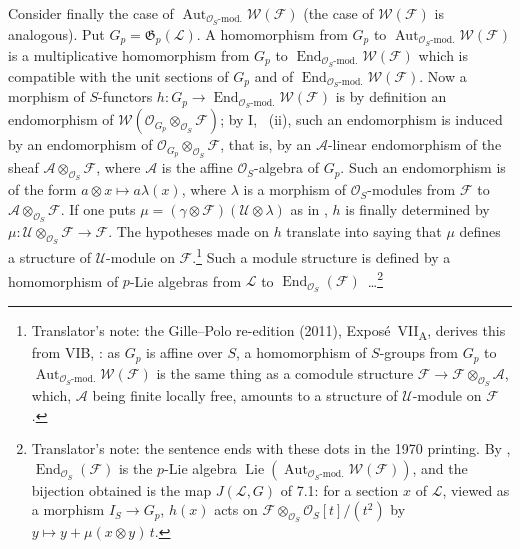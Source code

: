 Consider finally the case of
\(\operatorname{Aut}_{\mathcal O_S\text{-mod.}}\mathcal W(\mathcal F)\)
(the case of \(\mathcal W(\mathcal F)\) is analogous). Put
\(G_p=\mathfrak G_p(\mathcal L)\). A homomorphism from \(G_p\) to
\(\operatorname{Aut}_{\mathcal O_S\text{-mod.}}\mathcal W(\mathcal F)\) is
a multiplicative homomorphism from \(G_p\) to
\(\operatorname{End}_{\mathcal O_S\text{-mod.}}\mathcal W(\mathcal F)\)
which is compatible with the unit sections of \(G_p\) and of
\(\operatorname{End}_{\mathcal O_S\text{-mod.}}\mathcal W(\mathcal F)\).
Now a morphism of \(S\)-functors
\(h:G_p\to\operatorname{End}_{\mathcal O_S\text{-mod.}}\mathcal W(\mathcal F)\)
is by definition an endomorphism of
\(\mathcal W(\mathcal O_{G_p}\otimes_{\mathcal O_S}\mathcal F)\); by I,
~(ii), such an endomorphism is induced by an endomorphism of
\(\mathcal O_{G_p}\otimes_{\mathcal O_S}\mathcal F\), that is, by an
\(\mathcal A\)-linear endomorphism of the sheaf
\(\mathcal A\otimes_{\mathcal O_S}\mathcal F\), where \(\mathcal A\) is
the affine \(\mathcal O_S\)-algebra of \(G_p\). Such an endomorphism is of
the form \(a\otimes x\mapsto a\lambda(x)\), where \(\lambda\) is a
morphism of \(\mathcal O_S\)-modules from \(\mathcal F\) to
\(\mathcal A\otimes_{\mathcal O_S}\mathcal F\). If one puts
\(\mu=(\gamma\otimes\mathcal F)(\mathcal U\otimes\lambda)\) as in
, \(h\) is finally determined by
\(\mu:\mathcal U\otimes_{\mathcal O_S}\mathcal F\to\mathcal F\). The
hypotheses made on \(h\) translate into saying that \(\mu\) defines a
structure of \(\mathcal U\)-module on \(\mathcal F\).\footnote{Translator's
note: the Gille--Polo re-edition (2011), Expos\'e~VII\textsubscript{A},
derives this from VIB, : as \(G_p\) is affine over \(S\), a
homomorphism of \(S\)-groups from \(G_p\) to
\(\operatorname{Aut}_{\mathcal O_S\text{-mod.}}\mathcal W(\mathcal F)\) is
the same thing as a comodule structure
\(\mathcal F\to\mathcal F\otimes_{\mathcal O_S}\mathcal A\), which,
\(\mathcal A\) being finite locally free, amounts to a structure of
\(\mathcal U\)-module on \(\mathcal F\).} Such a module
structure is defined by a homomorphism of \(p\)-Lie algebras from
\(\mathcal L\) to \(\operatorname{End}_{\mathcal O_S}(\mathcal F)\)~\dots\footnote{Translator's
note: the sentence ends with these dots in the 1970 printing. By
, \(\operatorname{End}_{\mathcal O_S}(\mathcal F)\) is the
\(p\)-Lie algebra
\(\operatorname{Lie}(\operatorname{Aut}_{\mathcal O_S\text{-mod.}}\mathcal W(\mathcal F))\),
and the bijection obtained is the map \(J(\mathcal L,G)\) of 7.1: for a
section \(x\) of \(\mathcal L\), viewed as a morphism \(I_S\to G_p\),
\(h(x)\) acts on \(\mathcal F\otimes_{\mathcal O_S}\mathcal O_S[t]/(t^2)\)
by \(y\mapsto y+\mu(x\otimes y)\,t\).}

